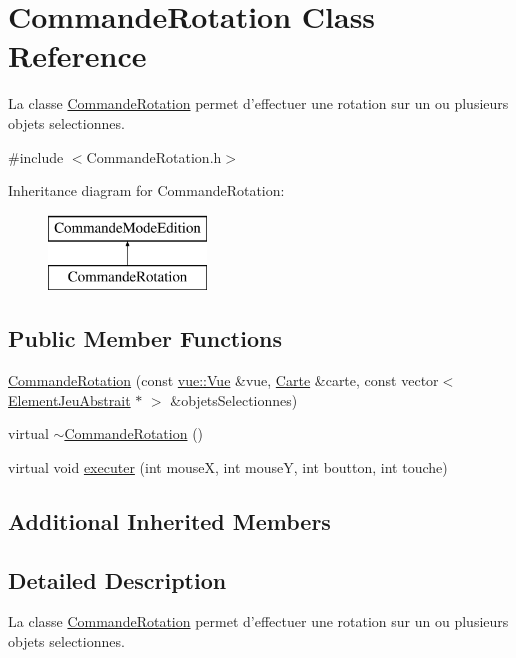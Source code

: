 \hypertarget{class_commande_rotation}{\section{Commande\-Rotation Class Reference}
\label{class_commande_rotation}
}


La classe \hyperlink{class_commande_rotation}{Commande\-Rotation} permet d'effectuer une rotation sur un ou plusieurs objets selectionnes.  




{\ttfamily \#include $<$Commande\-Rotation.\-h$>$}

Inheritance diagram for Commande\-Rotation\-:\begin{figure}[H]
\begin{center}
\leavevmode
\includegraphics[height=2.000000cm]{class_commande_rotation}
\end{center}
\end{figure}
\subsection*{Public Member Functions}
\begin{DoxyCompactItemize}
\item 
\hyperlink{class_commande_rotation_a761e2cdab1e1b916643bea637070646d}{Commande\-Rotation} (const \hyperlink{classvue_1_1_vue}{vue\-::\-Vue} \&vue, \hyperlink{class_carte}{Carte} \&carte, const vector$<$ \hyperlink{class_element_jeu_abstrait}{Element\-Jeu\-Abstrait} $\ast$ $>$ \&objets\-Selectionnes)
\item 
virtual \hyperlink{class_commande_rotation_a5e0b92f5c0dd1d93b9f608c02d94608c}{$\sim$\-Commande\-Rotation} ()
\item 
virtual void \hyperlink{class_commande_rotation_a2ee611526f6ed7720821dbf8e577fe64}{executer} (int mouse\-X, int mouse\-Y, int boutton, int touche)
\end{DoxyCompactItemize}
\subsection*{Additional Inherited Members}


\subsection{Detailed Description}
La classe \hyperlink{class_commande_rotation}{Commande\-Rotation} permet d'effectuer une rotation sur un ou plusieurs objets selectionnes. 

